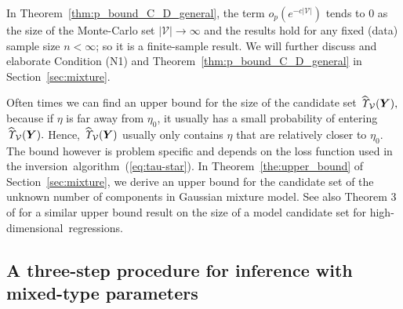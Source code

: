\documentclass[12pt]{article}
\theoremstyle{shortspace}
\def\*#1{\bm{#1}}
\begin{document}
In Theorem~\ref{thm:p_bound_C_D_general}, the term  
$o_p\left(e^{-c|{\mathcal V}|}\right)$ tends to $0$ as the size of the Monte-Carlo set $|{\mathcal V}| \to \infty$ and the results hold for any fixed (data) sample size $n < \infty$; so it is a finite-sample result.  
We will further discuss and elaborate Condition (N1) and Theorem~\ref{thm:p_bound_C_D_general} in Section~\ref{sec:mixture}.

Often times we can find an upper bound for the size of the candidate set $\widehat{\it \Upsilon}_{{\mathcal V}}(\*Y),$ because if $\eta$ is far away from $\eta_0$, it usually has a small probability of entering $\widehat{\it \Upsilon}_{{\mathcal V}}(\*Y).$ Hence, $\widehat{\it \Upsilon}_{{\mathcal V}}(\*Y)$ usually only contains $\eta$ that are relatively closer to $\eta_0.$ The bound however is problem specific and depends on the loss function used in the inversion~algorithm~(\ref{eq:tau-star}). In Theorem~\ref{the:upper_bound} of Section~\ref{sec:mixture}, we derive an upper bound for the candidate set of the unknown 
number of components in Gaussian mixture model. See also Theorem 3 of \cite{wang2022highdimenional} for a similar upper bound  result on the size of a model candidate set
for high-dimensional~regressions.




\subsection{\hspace{-3mm} A three-step procedure for inference with mixed-type parameters}\label{sec:ThreeSteps}
\end{document}
